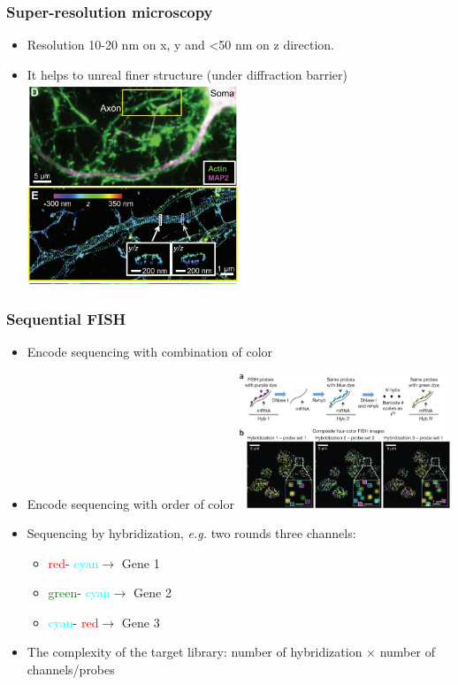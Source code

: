 \documentclass{beamer}
\newcommand{\red}{\textcolor{red}{red}}
\newcommand{\green}{\textcolor{green}{green}}
\newcommand{\cyan}{\textcolor{cyan}{cyan}}
\begin{document}
  \begin{frame}
  \frametitle{Super-resolution microscopy}
  \begin{itemize}
    \item Resolution 10-20 nm on x, y and <50 nm on z direction.
    \item It helps to unreal finer structure (under diffraction barrier)
      \centering
      \includegraphics[width=0.5\textwidth]{storm} \cite{xu2013actin}
  \end{itemize}
  \end{frame}

  \begin{frame}
  \frametitle{Sequential FISH}
  \centering
  \begin{itemize}
    \item Encode sequencing with combination of color \cite{lubeck2012single}
    \item Encode sequencing with order of color
    \centering
    \includegraphics[width=0.5\textwidth]{nmeth_2892_F1} \cite{lubeck2014single}
    \item Sequencing by hybridization, \textit{e.g.} two rounds three channels:
      \begin{itemize}
        \item \red - \cyan $\rightarrow$ Gene 1
        \item \green - \cyan $\rightarrow$ Gene 2
        \item \cyan - \red $\rightarrow$ Gene 3
      \end{itemize}
    \item The complexity of the target library: number of hybridization $\times$ number of channels/probes
  \end{itemize}
  \end{frame}
\end{document}
